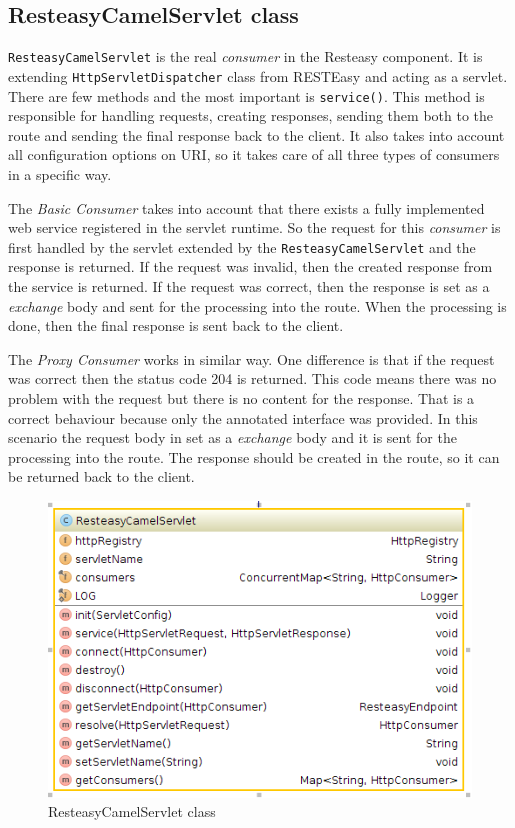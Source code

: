 \documentclass[12pt,final,oneside]{fithesis2}
\begin{document}
\subsection{ResteasyCamelServlet class}\label{servlet}
\texttt{ResteasyCamelServlet} is the real \textit{consumer} in the Resteasy component. It is extending \texttt{HttpServletDispatcher} class from RESTEasy and acting as a servlet. There are few methods and the most important is \texttt{service()}. This method is responsible for handling requests, creating responses, sending them both to the route and sending the final response back to the client. It also takes into account all configuration options on URI, so it takes care of all three types of consumers in a specific way. 

The \textit{Basic Consumer} takes into account that there exists a fully implemented web service registered in the servlet runtime. So the request for this \textit{consumer} is first handled by the servlet extended by the \texttt{ResteasyCamelServlet} and the response is returned. If the request was invalid, then the created response from the service is returned. If the request was correct, then the response is set as a \textit{exchange} body and sent for the processing into the route. When the processing is done, then the final response is sent back to the client. 

The \textit{Proxy Consumer} works in similar way. One difference is that if the request was correct then the status code 204 is returned. This code means there was no problem with the request but there is no content for the response\cite{http}. That is a correct behaviour because only the annotated interface was provided. In this scenario the request body in set as a \textit{exchange} body and it is sent for the processing into the route. The response should be created in the route, so it can be returned back to the client.

\begin{figure}[h]
\centering
\includegraphics[width=0.8\linewidth]{images/servlet.png}
\caption{ResteasyCamelServlet class}
\label{comp}
\end{figure}
\end{document}
